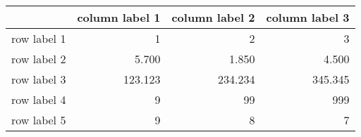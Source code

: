 \begin{tabular}{lrrr} 
\toprule 
  	 & 	 column label 1 	 & 	 column label 2 	 & 	 column label 3 \\ 
\midrule 
row label 1 	 & 	 1 	 & 	 2 	 & 	 3 \\ 
row label 2 	 & 	 5.700 	 & 	 1.850 	 & 	 4.500 \\ 
row label 3 	 & 	 123.123 	 & 	 234.234 	 & 	 345.345 \\ 
row label 4 	 & 	 9 	 & 	 99 	 & 	 999 \\ 
row label 5 	 & 	 9 	 & 	 8 	 & 	 7 \\ 
\bottomrule 
\end{tabular}